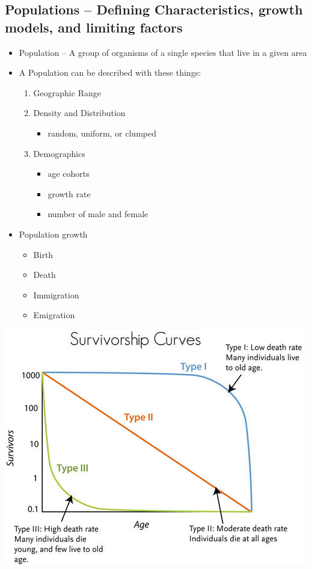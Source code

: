 \documentclass{article}
\begin{document}
\subsection{Populations -- Defining Characteristics, growth models, and limiting factors}
\begin{itemize}
\item Population -- A group of organisms of a single species that live in a given area
\item A Population can be described with these things:
\begin{enumerate}
\item Geographic Range
\item Density and Distribution
\begin{itemize}
\item random, uniform, or clumped
\end{itemize}
\item Demographics
\begin{itemize}
\item age cohorts
\item growth rate
\item number of male and female
\end{itemize}
\end{enumerate}

\item Population growth
\begin{itemize}
\item Birth
\item Death
\item Immigration
\item Emigration
\end{itemize}
\end{itemize}

\includegraphics[scale=1.5]{ssc}
\end{document}
